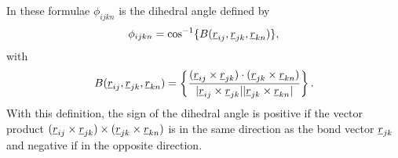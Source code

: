 In these formulae $\phi_{ijkn}$ is the dihedral angle defined by
\begin{equation}
\phi_{ijkn}=\cos^{-1}\{B(\mbox{$\underline{r}$}_{ij},\mbox{$\underline{r}$}_{jk},\mbox{$\underline{r}$}_{kn})\},
\end{equation}
with
\begin{equation}
B(\mbox{$\underline{r}$}_{ij},\mbox{$\underline{r}$}_{jk},\mbox{$\underline{r}$}_{kn})=
\left\{\frac{
(\mbox{$\underline{r}$}_{ij}\times\mbox{$\underline{r}$}_{jk})\cdot(\mbox{$\underline{r}$}_{jk}\times\mbox{$\underline{r}$}_{kn})}
{|\mbox{$\underline{r}$}_{ij}\times\mbox{$\underline{r}$}_{jk}||\mbox{$\underline{r}$}_{jk}\times\mbox{$\underline{r}$}_{kn}|}
\right\}.
\end{equation}
With this definition, the sign of the dihedral angle is positive if
the
vector product
$(\mbox{$\underline{r}$}_{ij}\times\mbox{$\underline{r}$}_{jk})\times(\mbox{$\underline{r}$}_{jk}\times\mbox{$\underline{r}$}_{kn})$
is in the same direction as the bond vector $\mbox{$\underline{r}$}_{jk}$ and
negative
if in the opposite direction.


